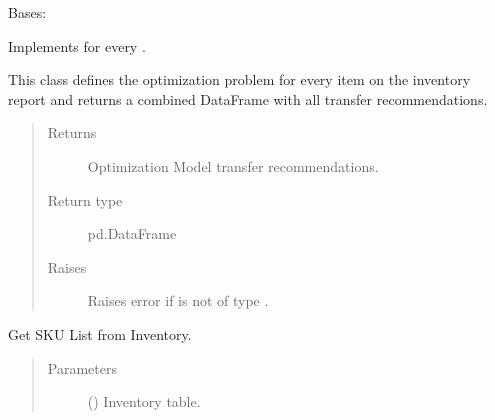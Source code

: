 \documentclass[letterpaper,10pt,english]{sphinxmanual}
\begin{document}
\begin{fulllineitems}
\label{\detokenize{source/optimization.model:optimization.model.main.ModelOptimization}}
Bases: 

Implements {\hyperref[\detokenize{source/optimization.model:optimization.model.optimizer.OptimizationModel}]{}}  for every .

This class defines the optimization problem for every item on the inventory report and
returns a combined DataFrame with all transfer recommendations.
\begin{quote}\begin{description}
\item[{Returns}] \leavevmode
Optimization Model transfer recommendations.

\item[{Return type}] \leavevmode
pd.DataFrame

\item[{Raises}] \leavevmode
{} \textendash{} Raises error if  is not of type .

\end{description}\end{quote}

\begin{fulllineitems}
\label{\detokenize{source/optimization.model:optimization.model.main.ModelOptimization._get_sku}}
Get SKU List from Inventory.
\begin{quote}\begin{description}
\item[{Parameters}] \leavevmode
{} () \textendash{} Inventory table.


\end{description}
\end{quote}
\end{fulllineitems}
\end{fulllineitems}
\end{document}
